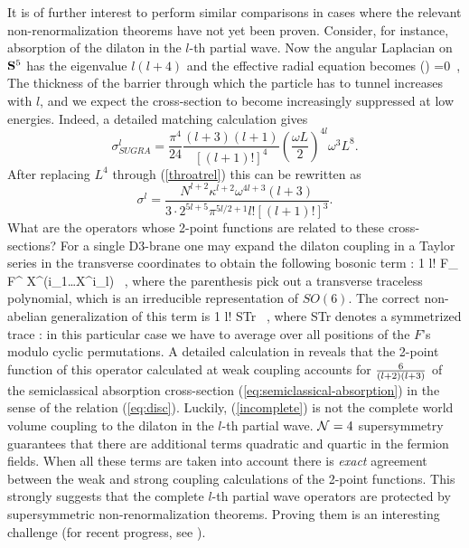 It is of further interest to perform similar comparisons in cases
where the relevant non-renormalization theorems have not yet been
proven. Consider, for instance, absorption of the dilaton in the
$l$-th partial wave. Now the angular Laplacian on ${\bf S}^5$ has the
eigenvalue $l(l+4)$ and the effective radial equation becomes
\be
\label{partialthree}
 \psi(\rho) =0\ ,
\ee
The thickness of the barrier through which the particle has to
tunnel increases with $l$, and we expect the cross-section
to become increasingly suppressed at low energies.
Indeed, a detailed matching calculation \cite{gukt,KTV} gives  
\begin{equation}
\sigma^l_{SUGRA} = \frac{\pi^4}{ 24}  \frac{(l + 3) (l + 1)}{ [(l + 1)!]^4}
\left( \frac{\omega L}{ 2} \right)^{4l} \omega^3 L^8.
\end{equation}
After 
replacing $L^4$ through (\ref{throatrel}) this can be rewritten as
\begin{equation}
\sigma^l = \frac{N^{l + 2} \kappa^{l + 2} \omega^{4l + 3} (l + 3)}{
3 \cdot 2^{5l + 5} \pi^{5l/2 + 1}l![(l + 1)!]^3}.
\label{eq:semiclassical-absorption}
\end{equation}
What are the operators whose 2-point functions are related to these
cross-sections? For a single D3-brane one may expand the
dilaton coupling in a Taylor series in the transverse coordinates to
obtain the following bosonic term \cite{kleb}:
\be
{1 l!} F_{\alpha\beta} F^{\alpha\beta} X^{(i_1}\ldots X^{i_l)}
\ ,
\ee
where the parenthesis pick out a transverse traceless polynomial,
which is an irreducible representation of $SO(6)$.
The correct non-abelian generalization of this term is
\cite{KTV}
\be \label{incomplete}
{1 l!} {\rm STr} 
\ ,
\ee
where STr denotes a symmetrized trace \cite{Tseytlin}: 
in this particular case we have to average
over all positions of the $F$'s modulo cyclic permutations.
A detailed calculation in \cite{KTV} reveals that the 2-point function
of this operator calculated at weak coupling
accounts for ${6\over (l+2)(l+3)} $ 
of the semiclassical absorption cross-section
(\ref{eq:semiclassical-absorption}) in the sense of the relation
(\ref{eq:disc}). Luckily, (\ref{incomplete}) is not the complete
world volume coupling to the dilaton in the $l$-th partial wave.
${\cal N}=4$ supersymmetry guarantees that there are additional terms
quadratic and quartic in the fermion fields. When all these terms are
taken into account there is {\it exact} agreement between the weak
and strong coupling calculations of the 2-point functions.
This strongly suggests that the complete $l$-th
partial wave operators are protected by supersymmetric
non-renormalization theorems. Proving them is an interesting challenge
(for recent progress, see \cite{Sken}).

